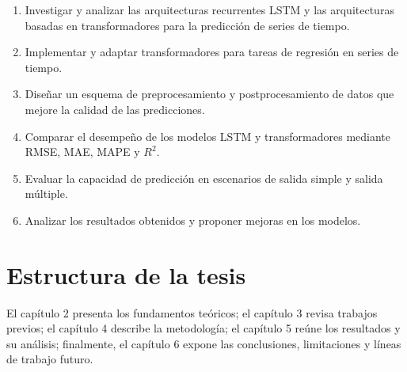 \begin{enumerate}
  \item Investigar y analizar las arquitecturas recurrentes LSTM y las arquitecturas basadas en transformadores para la predicción de series de tiempo.
  \item Implementar y adaptar transformadores para tareas de regresión en series de tiempo.
  \item Diseñar un esquema de preprocesamiento y postprocesamiento de datos que mejore la calidad de las predicciones.
  \item Comparar el desempeño de los modelos LSTM y transformadores mediante RMSE, MAE, MAPE y $R^2$.
  \item Evaluar la capacidad de predicción en escenarios de salida simple y salida múltiple.
  \item Analizar los resultados obtenidos y proponer mejoras en los modelos.
\end{enumerate}

\section{Estructura de la tesis}

El capítulo 2 presenta los fundamentos teóricos; el capítulo 3 revisa trabajos previos; el capítulo 4 describe la metodología; el capítulo 5 reúne los resultados y su análisis; finalmente, el capítulo 6 expone las conclusiones, limitaciones y líneas de trabajo futuro.
